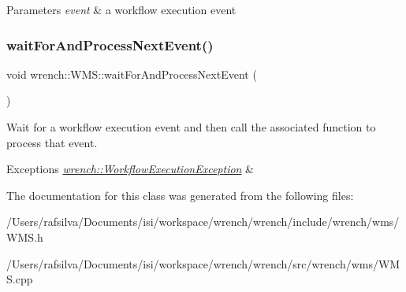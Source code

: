 \begin{DoxyParams}{Parameters}
{\em event} & a workflow execution event \\
\hline
\end{DoxyParams}
\mbox{\label{classwrench_1_1_w_m_s_a2923b4ec6f7e233693199154d5206d5f}} 
\subsubsection{\texorpdfstring{wait\+For\+And\+Process\+Next\+Event()}{waitForAndProcessNextEvent()}}
{\footnotesize\ttfamily void wrench\+::\+W\+M\+S\+::wait\+For\+And\+Process\+Next\+Event (\begin{DoxyParamCaption}{ }\end{DoxyParamCaption})\hspace{0.3cm}{\ttfamily [protected]}}



Wait for a workflow execution event and then call the associated function to process that event. 


\begin{DoxyExceptions}{Exceptions}
{\em \hyperlink{classwrench_1_1_workflow_execution_exception}{wrench\+::\+Workflow\+Execution\+Exception}} & \\
\hline
\end{DoxyExceptions}


The documentation for this class was generated from the following files\+:\begin{DoxyCompactItemize}
\item 
/\+Users/rafsilva/\+Documents/isi/workspace/wrench/wrench/include/wrench/wms/W\+M\+S.\+h\item 
/\+Users/rafsilva/\+Documents/isi/workspace/wrench/wrench/src/wrench/wms/W\+M\+S.\+cpp\end{DoxyCompactItemize}
